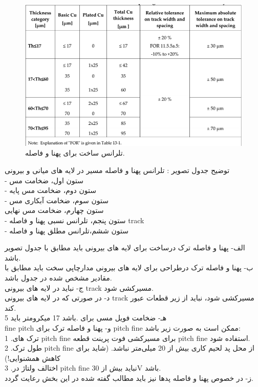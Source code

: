 \begin{figure}[!h]
	\centering
	\includegraphics[width=0.7\linewidth]{Assets/pcbtolerance.png}
	\caption{تلرانس ساخت برای پهنا و فاصله.}
	\label{fig:pcbtolerance}
\end{figure}

توضیح جدول تصویر : تلرانس پهنا و فاصله مسیر در لایه های میانی و بیرونی\\
- ستون اول، ضخامت مس\\
- ستون دوم، ضخامت مس پایه \\
- ستون سوم، ضخامت آبکاری مس \\
ستون چهارم، ضخامت مس نهایی \\
- ستون پنجم، تلرانس نسبی پهنا و فاصله track \\
- ستون ششم،تلرانس مطلق پهنا و فاصله\\


الف- پهنا و فاصله ترک درساخت برای لایه های بیرونی باید مطابق با جدول تصویر  باشد.\\
ب- پهنا و فاصله ترک درطراحی برای لایه های بیرونی مدارچاپی سخت باید مطابق با مقادیر
مشخص شده در جدول  باشد.\\
ج- نباید در لایه های بیرونی track مسیرکشی شود.\\
د- در صورتی که در لایه های بیرونی track مسیرکشی شود، نباید از زیر قطعات عبور کند.\\
5 هـ- ضخامت فویل مسی برای
.باشد 17 میکرومتر باید \\fine pitch
و- پهنا و فاصله ترک برای pitch fine ممکن است به صورت زیر باشد:\\
1 .ترک های pitch fine برای مسیرکشی فوت پرینت قطعه pitch fine استفاده شود.\\
2 .طول ترک pitch fine از محل پد لحیم کاری بیش از 20 میلی‌متر نباشد. (شاید برای کاهش همشنوایی!)\\
3 .اختالف ولتاژ در pitch fine نباید بیش از 30V باشد.\\
ز- در خصوص پهنا و فاصله پدها نیز باید مطالب گفته شده در این بخش رعایت گردد.


